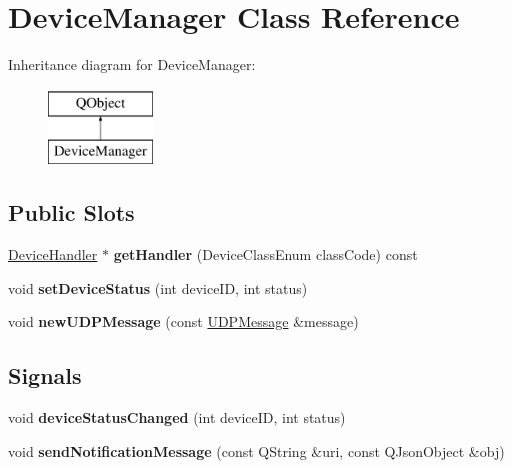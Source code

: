 \hypertarget{class_device_manager}{}\section{Device\+Manager Class Reference}
\label{class_device_manager}
Inheritance diagram for Device\+Manager\+:\begin{figure}[H]
\begin{center}
\leavevmode
\includegraphics[height=2.000000cm]{class_device_manager}
\end{center}
\end{figure}
\subsection*{Public Slots}
\begin{DoxyCompactItemize}
\item 
\mbox{\label{class_device_manager_a693a3a80d7cefeaabbc29fd8695f9e1a}} 
\hyperlink{class_device_handler}{Device\+Handler} $\ast$ {\bfseries get\+Handler} (Device\+Class\+Enum class\+Code) const
\item 
\mbox{\label{class_device_manager_a037575d38c8aa473d57de2950e0daa18}} 
void {\bfseries set\+Device\+Status} (int device\+ID, int status)
\item 
\mbox{\label{class_device_manager_aa231eea3b24b3418482506be4b7d02ef}} 
void {\bfseries new\+U\+D\+P\+Message} (const \hyperlink{class_u_d_p_message}{U\+D\+P\+Message} \&message)
\end{DoxyCompactItemize}
\subsection*{Signals}
\begin{DoxyCompactItemize}
\item 
\mbox{\label{class_device_manager_aa96a714f5d7b0a43c5b37622df5f4800}} 
void {\bfseries device\+Status\+Changed} (int device\+ID, int status)
\item 
\mbox{\label{class_device_manager_a2b8369554a4720f18d7ab3aef8a847ec}} 
void {\bfseries send\+Notification\+Message} (const Q\+String \&uri, const Q\+Json\+Object \&obj)
\end{DoxyCompactItemize}
